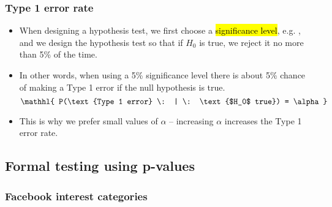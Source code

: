 \documentclass[t,compress,mathserif]{beamer}
\begin{document}
\begin{frame}
\frametitle{Type 1 error rate}

\begin{itemize}

\item When designing a hypothesis test, we first choose a \hl{significance level}, e.g. , and we design the hypothesis test so that if $H_0$ is true, we reject it no more than 5\% of the time.

\pause

\item In other words, when using a 5\% significance level there is about 5\% chance of making a Type 1 error if the null hypothesis is true.
\[ \mathhl{ P(\text{Type 1 error} \: | \: \text{$H_0$ true}) = \alpha } \]

\pause

\item This is why we prefer small values of $\alpha$ -- increasing $\alpha$ increases the Type 1 error rate.

\end{itemize}

\end{frame}




\subsection{Formal testing using p-values}


\begin{frame}
\frametitle{Facebook interest categories}


\vfill


\end{frame}
\end{document}
